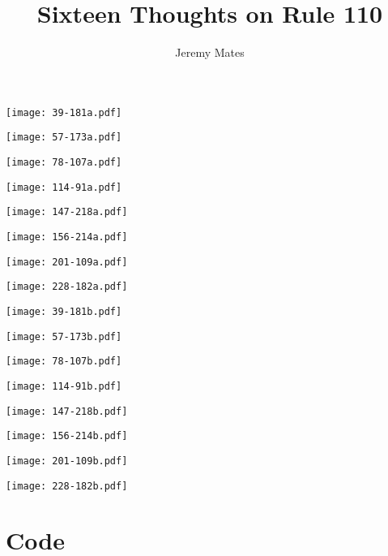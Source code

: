 \documentclass[a4paper,10pt,twoside,onecolumn,openany,final]{memoir}
\title{Sixteen Thoughts on Rule 110}
\author{Jeremy Mates}
\begin{document}


\mainmatter

\begin{center}
\bfseries \Huge \thetitle
\end{center}
\begin{flushright}
\theauthor
\end{flushright}

\texttt{[image: 39-181a.pdf]}%

\texttt{[image: 57-173a.pdf]}%

\texttt{[image: 78-107a.pdf]}%

\texttt{[image: 114-91a.pdf]}%

\texttt{[image: 147-218a.pdf]}%

\texttt{[image: 156-214a.pdf]}%

\texttt{[image: 201-109a.pdf]}%

\texttt{[image: 228-182a.pdf]}%

\texttt{[image: 39-181b.pdf]}%

\texttt{[image: 57-173b.pdf]}%

\texttt{[image: 78-107b.pdf]}%

\texttt{[image: 114-91b.pdf]}%

\texttt{[image: 147-218b.pdf]}%

\texttt{[image: 156-214b.pdf]}%

\texttt{[image: 201-109b.pdf]}%

\texttt{[image: 228-182b.pdf]}%

\chapter*{Code}
\end{document}

